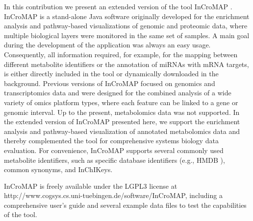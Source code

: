 \documentclass[final,5p,times,twocolumn]{elsarticle}
\begin{document}
In this contribution we present an extended version of the tool InCroMAP \cite{Wrzodek2012a,Wrzodek2012b}. InCroMAP is a stand-alone Java software originally developed for the enrichment analysis and pathway-based visualizations of genomic and proteomic data, where multiple biological layers were monitored in the same set of samples. A main goal during the development of the application was always an easy usage. Consequently, all information required, for example, for the mapping between different metabolite identifiers or the annotation of miRNAs with mRNA targets, is either directly included in the tool or dynamically downloaded in the background. Previous versions of InCroMAP focused on genomics and transcriptomics data and were designed for the combined analysis of a wide variety of omics platform types, where each feature can be linked to a gene or genomic interval. Up to the present, metabolomics data was not supported. In the extended version of InCroMAP presented here, we support the enrichment analysis and pathway-based visualization of annotated metabolomics data and thereby complemented the tool for comprehensive systems biology data evaluation. For convenience, InCroMAP supports several commonly used metabolite identifiers, such as specific database identifiers (e.g., HMDB \cite{Wishart2009}), common synonyms, and InChIKeys. 

InCroMAP is freely available under the LGPL3 license at http://www.cogsys.cs.uni-tuebingen.de/software/InCroMAP, including a comprehensive user’s guide and several example data files to test the capabilities of the tool.
\end{document}
